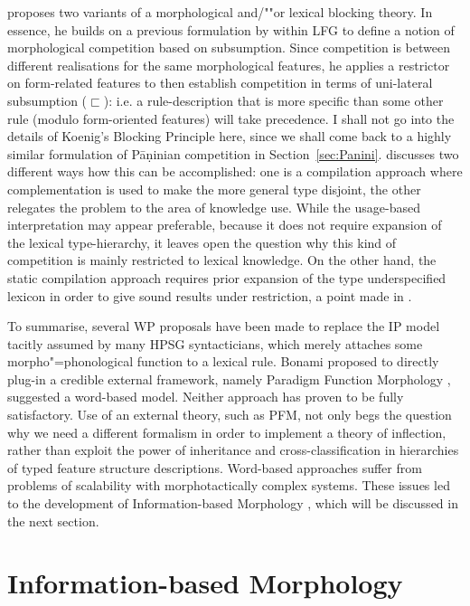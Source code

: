 \documentclass[output=paper
	        ,collection
	        ,collectionchapter
 	        ,biblatex
                ,babelshorthands
                ,newtxmath
                ,draftmode
                ,colorlinks, citecolor=brown
]{langscibook}
\begin{document}
{\citet{Koenig99} proposes two variants of a morphological and/""or lexical blocking
theory. In essence, he builds on a previous formulation by
\citet{Andrews90} within LFG to define a notion of morphological
competition based on subsumption. Since competition is between
different realisations for the same morphological features, he applies
a restrictor on form-related features to then establish competition in
terms of uni-lateral subsumption ($\sqsubset$): i.e. a
rule-description that is more specific than some other rule (modulo
form-oriented features) will take precedence. I shall not go into the
details of Koenig's Blocking Principle here, since we shall come back
to a highly similar formulation of Pāṇinian competition in
Section~\ref{sec:Panini}.  \citet{Koenig99} discusses two different
ways how this can be accomplished: one is a compilation approach where
complementation is used to make the more general type disjoint, the
other relegates the problem to the area of knowledge use. While the
usage-based interpretation may appear preferable, because it does not
require expansion of the lexical type-hierarchy, it leaves open the
question why this kind of competition is mainly restricted to lexical
knowledge. On the other hand, the static compilation approach requires
prior expansion of the type underspecified lexicon in order to give
sound results under restriction, a point made in
\citet{crysmann_b03book}.

To summarise, several WP proposals have been made to
replace the IP model tacitly assumed by many HPSG syntacticians, which
merely attaches some morpho"=phonological function to a lexical rule.
Bonami \citep{Bonami08f,Bonami06,Bonami07e,Bonami11f} proposed to
directly plug-in a credible external framework, namely Paradigm
Function Morphology \citep{Stump01}, \citet{Koenig99} suggested a
word-based model. Neither approach has proven to be fully
satisfactory. Use of an external theory, such as PFM, not only begs
the question why we need a different formalism in order to implement a
theory of inflection, rather than exploit the power of inheritance and
cross-classification in hierarchies of typed feature structure
descriptions. Word-based approaches suffer from problems of
scalability with morphotactically complex systems.  These issues led
to the development of Information-based Morphology
\citep{Crysmann:Bonami:2016}, which will be discussed in the next
section.


\section{Information-based Morphology}
\label{sec:IbM}

}
\end{document}
